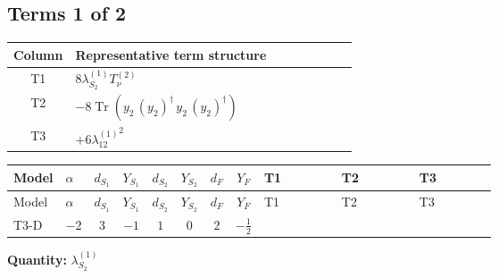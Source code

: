 \documentclass[8pt]{article}
\begin{document}
\begin{landscape}
\subsection*{Terms 1 of 2}
\begin{center}
\begin{tabular}{@{}c >{\raggedright\arraybackslash}p{0.82\linewidth}@{}}
\toprule
Column & Representative term structure \\
\midrule
T1 & \(\displaystyle 8 {\lambda_{S_2}^{(1)}} T_{\nu}^{(2)}\) \\
\midrule
T2 & \(\displaystyle -8 \operatorname{Tr}\!\left({y_2}\,\left({y_2}\right)^{\dagger}\,{y_2}\,\left({y_2}\right)^{\dagger}\right)\) \\
\midrule
T3 & \(\displaystyle +6 {\lambda_{12}^{(1)}}^2\) \\
\midrule
\bottomrule
\end{tabular}
\end{center}
\smallskip
\tiny
\begin{longtable}{@{}llcccccc >{\raggedright\arraybackslash}p{0.21\linewidth} >{\raggedright\arraybackslash}p{0.21\linewidth} >{\raggedright\arraybackslash}p{0.21\linewidth}@{}}
\toprule
Model & $\alpha$ & $d_{S_1}$ & $Y_{S_1}$ & $d_{S_2}$ & $Y_{S_2}$ & $d_F$ & $Y_F$ & T1 & T2 & T3 \\
\midrule
\endfirsthead
\toprule
Model & $\alpha$ & $d_{S_1}$ & $Y_{S_1}$ & $d_{S_2}$ & $Y_{S_2}$ & $d_F$ & $Y_F$ & T1 & T2 & T3 \\
\midrule
\endhead
T3-D & $-2$ & $3$ & $-1$ & $1$ & $0$ & $2$ & $-\frac{1}{2}$ & \scriptsize\adjustbox{max width=\linewidth}{$\begin{gathered} 8 {\lambda_{S_2}^{(1)}} T_{\nu}^{(2)}\end{gathered}$} & \scriptsize\adjustbox{max width=\linewidth}{$\begin{gathered} -8 \operatorname{Tr}\!\left({y_2}\,\left({y_2}\right)^{\dagger}\,{y_2}\,\left({y_2}\right)^{\dagger}\right)\end{gathered}$} & \scriptsize\adjustbox{max width=\linewidth}{$\begin{gathered} +6 {\lambda_{12}^{(1)}}^2\end{gathered}$} \\
\midrule
\bottomrule
\end{longtable}
\clearpage
\noindent\textbf{Quantity: }$\lambda_{S_2}^{(1)}$\par\smallskip

\end{landscape}
\end{document}
